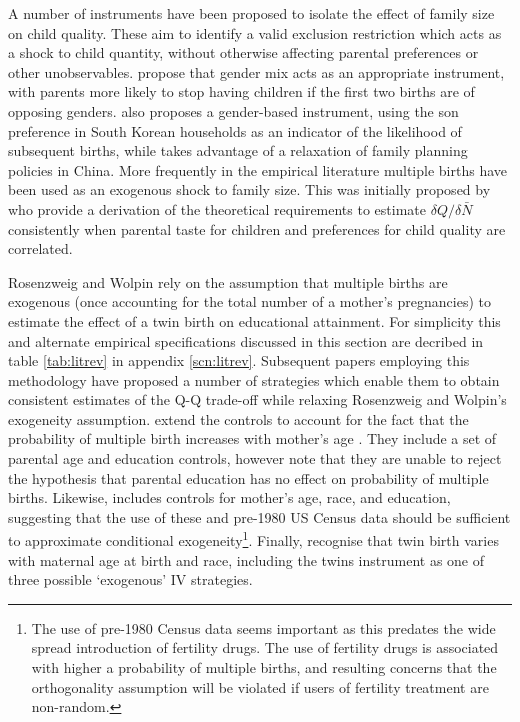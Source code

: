 A number of instruments have been proposed to isolate the effect of family size on child quality.  These aim to identify a valid exclusion restriction which acts as a shock to child quantity, without otherwise affecting parental preferences or other unobservables.  \citet{ConleyGlauber2006} propose that gender mix acts as an appropriate instrument, with parents more likely to stop having children if the first two births are of opposing genders.  \citet{Lee2008} also proposes a gender-based instrument, using the son preference in South Korean households as an indicator of the likelihood of subsequent births, while \citet{Qian2009} takes advantage of a relaxation of family planning policies in China.  More frequently in the empirical literature multiple births have been used as an exogenous shock to family size.  This was initially proposed by \citet{RosenzweigWolpin1980} who provide a derivation of the theoretical requirements to estimate $\delta Q/ \delta\bar{N}$ consistently when parental taste for children and preferences for child quality are correlated.

Rosenzweig and Wolpin rely on the assumption that multiple births are exogenous (once accounting for the total number of a mother's pregnancies) to estimate the effect of a twin birth on educational attainment.  For simplicity this and alternate empirical specifications discussed in this section are decribed in table \ref{tab:litrev} in appendix \ref{scn:litrev}.  Subsequent papers employing this methodology have proposed a number of strategies which enable them to obtain consistent estimates of the Q-Q trade-off while relaxing Rosenzweig and Wolpin's exogeneity assumption.  \citet{Blacketal2005} extend the controls to account for the fact that the probability of multiple birth increases with mother's age \citep{Jacobsenetal1999}.  They include a set of parental age and education controls, however note that they are unable to reject the hypothesis that parental education has no effect on probability of multiple births.  Likewise, \citet{Caceres2006} includes controls for mother's age, race, and education, suggesting that the use of these and pre-1980 US Census data should be sufficient to approximate conditional exogeneity\footnote{The use of pre-1980 Census data seems important as this predates the wide spread introduction of fertility drugs.  The use of fertility drugs is associated with higher a probability of multiple births, and resulting concerns that the orthogonality assumption will be violated if users of fertility treatment are non-random.}.  Finally, \citet{Angristetal2010} recognise that twin birth varies with maternal age at birth and race, including the twins instrument as one of three possible `exogenous' IV strategies. 

